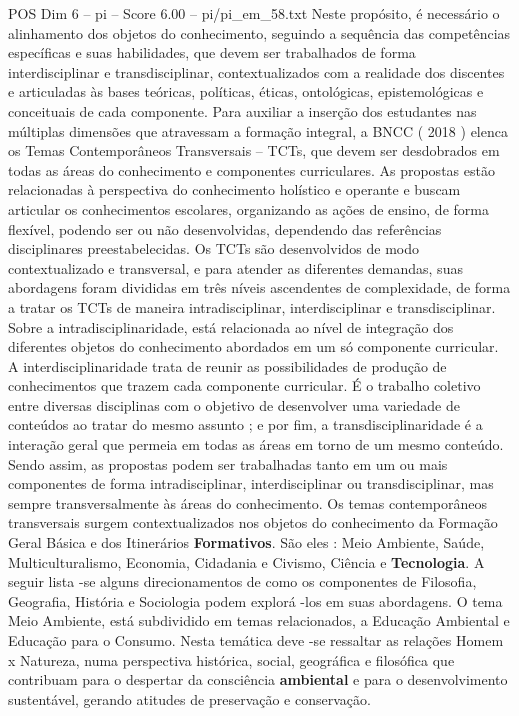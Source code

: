 \begin{textsample}{POS Dim 6 – pi – Score 6.00 – pi/pi\_em\_58.txt}
Neste propósito, é necessário o alinhamento dos objetos do conhecimento, seguindo a sequência das competências específicas e suas habilidades, que devem ser trabalhados de forma interdisciplinar e transdisciplinar, contextualizados com a realidade dos discentes e articuladas às bases teóricas, políticas, éticas, ontológicas, epistemológicas e conceituais de cada componente.
Para auxiliar a inserção dos estudantes nas múltiplas dimensões que atravessam a formação integral, a BNCC ( 2018 ) elenca os Temas Contemporâneos Transversais – TCTs, que devem ser desdobrados em todas as áreas do conhecimento e componentes curriculares.
As propostas estão relacionadas à perspectiva do conhecimento holístico e operante e buscam articular os conhecimentos escolares, organizando as ações de ensino, de forma flexível, podendo ser ou não desenvolvidas, dependendo das referências disciplinares preestabelecidas.
Os TCTs são desenvolvidos de modo contextualizado e transversal, e para atender as diferentes demandas, suas abordagens foram divididas em três níveis ascendentes de complexidade, de forma a tratar os TCTs de maneira intradisciplinar, interdisciplinar e transdisciplinar.
Sobre a intradisciplinaridade, está relacionada ao nível de integração dos diferentes objetos do conhecimento abordados em um só componente curricular.
A interdisciplinaridade trata de reunir as possibilidades de produção de conhecimentos que trazem cada componente curricular.
É o trabalho coletivo entre diversas disciplinas com o objetivo de desenvolver uma variedade de conteúdos ao tratar do mesmo assunto ; e por fim, a transdisciplinaridade é a interação geral que permeia em todas as áreas em torno de um mesmo conteúdo.
Sendo assim, as propostas podem ser trabalhadas tanto em um ou mais componentes de forma intradisciplinar, interdisciplinar ou transdisciplinar, mas sempre transversalmente às áreas do conhecimento.
Os temas contemporâneos transversais surgem contextualizados nos objetos do conhecimento da Formação Geral Básica e dos Itinerários \textbf{Formativos}.
São eles : Meio Ambiente, Saúde, Multiculturalismo, Economia, Cidadania e Civismo, Ciência e \textbf{Tecnologia}.
A seguir lista -se alguns direcionamentos de como os componentes de Filosofia, Geografia, História e Sociologia podem explorá -los em suas abordagens.
O tema Meio Ambiente, está subdividido em temas relacionados, a Educação Ambiental e Educação para o Consumo.
Nesta temática deve -se ressaltar as relações Homem x Natureza, numa perspectiva histórica, social, geográfica e filosófica que contribuam para o despertar da consciência \textbf{ambiental} e para o desenvolvimento sustentável, gerando atitudes de preservação e conservação.

\end{textsample}
